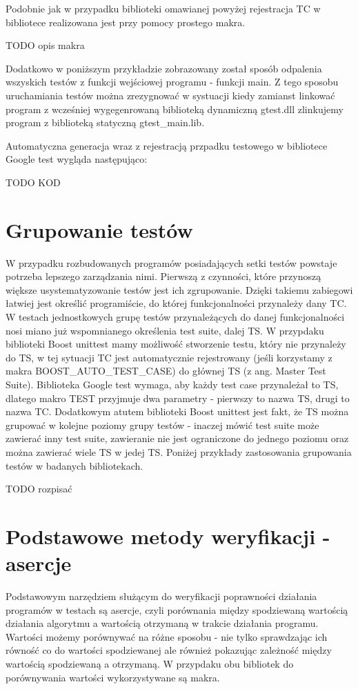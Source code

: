 \documentclass[12pt,a4paper,notitlepage]{report}
\begin{document}
Podobnie jak w przypadku biblioteki omawianej powyżej rejestracja TC w bibliotece realizowana jest przy pomocy prostego makra. 

TODO opis makra

Dodatkowo w poniższym przykładzie zobrazowany został sposób odpalenia wszyskich testów z funkcji wejściowej programu - funkcji main. Z tego sposobu uruchamiania testów można zrezygnować w systuacji kiedy zamianst linkować program z wcześniej wygegenrowaną biblioteką dynamiczną gtest.dll zlinkujemy program z biblioteką statyczną gtest_main.lib.

Automatyczna generacja wraz z rejestracją przpadku testowego w bibliotece Google test wygląda następująco:

TODO KOD

\chapter{Grupowanie testów}

W przypadku rozbudowanych programów posiadających setki testów powstaje potrzeba lepszego zarządzania nimi. Pierwszą z czynności, które przynoszą większe usystematyzowanie testów jest ich zgrupowanie. Dzięki takiemu zabiegowi łatwiej jest określić programiście, do której funkcjonalności przynależy dany TC.
W testach jednostkowych grupę testów przynależących do danej funkcjonalności nosi miano już wspomnianego określenia test suite, dalej TS. 
W przypdaku biblioteki Boost unittest mamy możliwość stworzenie testu, który nie przynależy do TS, w tej sytuacji TC jest automatycznie rejestrowany (jeśli korzystamy z makra BOOST_AUTO_TEST_CASE) do głównej TS (z ang. Master Test Suite).
Biblioteka Google test wymaga, aby każdy test case przynależał to TS, dlatego makro TEST przyjmuje dwa parametry - pierwszy to nazwa TS, drugi to nazwa TC.
Dodatkowym atutem biblioteki Boost unittest jest fakt, że TS można grupować w kolejne poziomy grupy testów - inaczej mówić test suite może zawierać inny test suite, zawieranie nie jest ograniczone do jednego poziomu oraz można zawierać wiele TS w jedej TS.
Poniżej przykłady zastosowania grupowania testów w badanych bibliotekach.

TODO rozpisać

\chapter{Podstawowe metody weryfikacji - asercje}

Podstawowym narzędziem służącym do weryfikacji poprawności działania programów w testach są asercje, czyli porównania między spodziewaną wartością działania algorytmu a wartością otrzymaną w trakcie działania programu.
Wartości możemy porównywać na różne sposobu - nie tylko sprawdzając ich równość co do wartości spodziewanej ale również pokazując zależność między wartością spodziewaną a otrzymaną. W przypdaku obu bibliotek do porównywania wartości wykorzystywane są makra.
\end{document}
